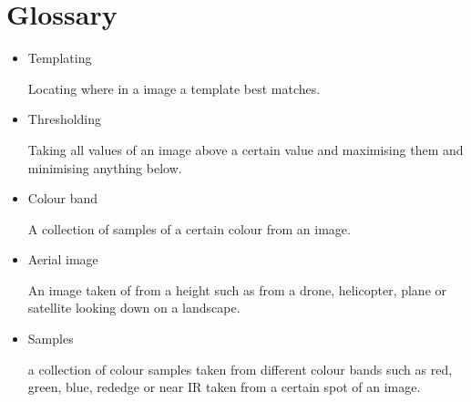 \thispagestyle{empty}


\section*{\centering Glossary}

\begin{itemize}
    \item Templating
    
    Locating where in a image a template best matches.
    
    \item Thresholding
    
    Taking all values of an image above a certain value and maximising them and minimising anything below.
    
    \item Colour band
    
    A collection of samples of a certain colour from an image.
    
    \item Aerial image
    
    An image taken of from a height such as from a drone, helicopter, plane or satellite looking down on a landscape.
    
    \item Samples
    
    a collection of colour samples taken from different colour bands such as red, green, blue, rededge or near IR taken from a certain spot of an image. 
    
    
    
\end{itemize}

